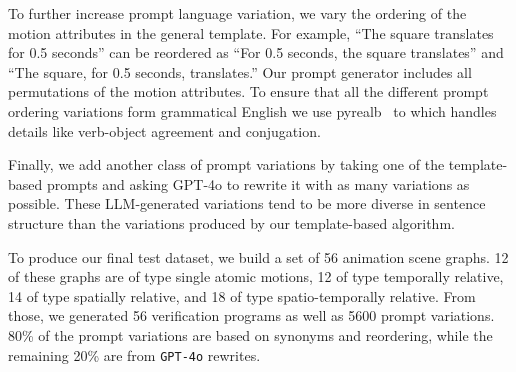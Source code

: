 %

To further increase prompt language variation, we vary the ordering of
the motion attributes in the general template.  For example, ``The square translates for 0.5
seconds'' can be reordered as ``For 0.5 seconds, the square
translates'' and ``The square, for 0.5 seconds, translates.''  Our
prompt generator includes all permutations of the motion attributes.
%
To ensure that all the different prompt ordering variations form
grammatical English we use pyrealb~\cite{lapalme2024pyrealb} to which
handles details like verb-object agreement and conjugation.

Finally, we add another class of prompt variations by taking one of
the template-based prompts and asking GPT-4o to rewrite
it with as many variations as possible. These LLM-generated variations
tend to be more diverse in sentence structure than the variations
produced by our template-based algorithm.

To produce our final test dataset, we build a set of 56 animation
scene graphs. 12 of these graphs are of type single atomic motions, 12
of type temporally relative, 14 of type spatially relative, and 18 of
type spatio-temporally relative.
From those, we generated 56 \dslname{} verification programs as well
as 5600 prompt variations.  80\% of the prompt variations are
based on synonyms and reordering, while the remaining 20\% are from
\texttt{GPT-4o} rewrites.



